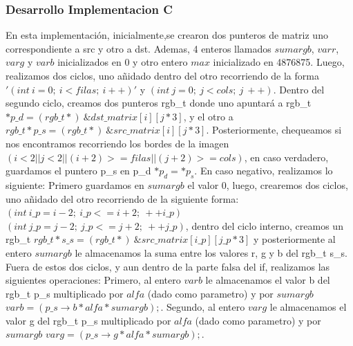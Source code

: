 \vspace*{0.3cm} \noindent
\subsubsection{Desarrollo Implementacion C}

En esta implementación, inicialmente,se crearon dos punteros de matriz uno correspondiente a src y otro a dst.\newline 
Ademas, 4 enteros llamados $sumargb$, $varr$,$varg$ y $varb$ inicializados en 0 y otro entero $max$ inicializado en 4876875. \newline
Luego, realizamos dos ciclos, uno añidado dentro del otro recorriendo de la forma $'(int\ i = 0;\ i < filas;\ i++)'$ y 
$(int\ j = 0;\ j < cols;\ j\ ++)$.\newline
Dentro del segundo ciclo, creamos dos punteros rgb\_t donde uno apuntará a \newline rgb\_t $*p\_d = (rgb\_t*)\  \&dst\_matrix[i][j*3]$, y el otro
a $rgb\_t *p\_s = (rgb\_t*)\ \&src\_matrix[i][j*3]$.\newline
Posteriormente, chequeamos si nos encontramos recorriendo los bordes de la imagen \newline $(i < 2 || j < 2 || (i + 2) >= filas || (j + 2) >= cols)$,
en caso verdadero, guardamos el puntero p\_s en p\_d $*p_d=*p_s$. \newline
En caso negativo, realizamos lo siguiente:\newline
Primero guardamos en $sumargb$ el valor 0, luego, crearemos dos ciclos, uno añidado del otro recorriendo de la siguiente forma:\newline
$(int\  i\_p = i-2;\  i\_p <= i+2;\  ++i\_p)$ $(int\  j\_p = j-2;\  j\_p <= j+2;\  ++j\_p)$, dentro del ciclo interno,
creamos un rgb\_t $rgb\_t *s\_s = (rgb\_t*)\  \&src\_matrix[i\_p][j\_p*3]$ y posteriormente al entero $sumargb$ le almacenamos la
suma entre los valores r, g y b del rgb\_t s\_s.\newline
Fuera de estos dos ciclos, y aun dentro de la parte falsa del if, realizamos las siguientes operaciones:\newline
Primero, al entero $varb$ le almacenamos el valor b del rgb\_t p\_s multiplicado por $alfa$ (dado como parametro) y por $sumargb$ $varb = (p\_s\rightarrow b * alfa * sumargb);$.\newline
Segundo, al entero $varg$ le almacenamos el valor g del rgb\_t p\_s multiplicado por $alfa$ (dado como parametro) y por $sumargb$ $varg = (p\_s\rightarrow g * alfa * sumargb);$.\newline

